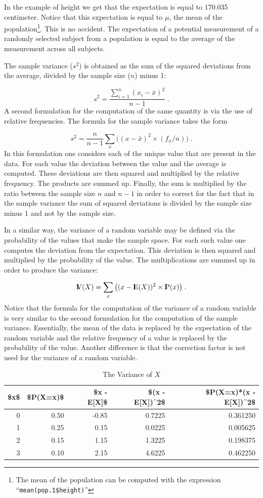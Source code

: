\documentclass[]{krantz}
\newcommand{\Expec}{{\rm I\kern-.3em E}}
\newcommand{\Prob}{{\rm I\kern-.3em P}}
\newcommand{\Var}{{\rm I\kern-.3em V}}
\theoremstyle{definition}
\theoremstyle{definition}
\theoremstyle{definition}
\theoremstyle{remark}
\begin{document}
In the example of height we get that the expectation is equal to 170.035
centimeter. Notice that this expectation is equal to \(\mu\), the mean
of the population\footnote{The mean of the population can be computed
  with the expression ``\texttt{mean(pop.1\$height)}''}. This is no
accident. The expectation of a potential measurement of a randomly
selected subject from a population is equal to the average of the
measurement across all subjects.

The sample variance (\(s^2\)) is obtained as the sum of the squared
deviations from the average, divided by the sample size (\(n\)) minus 1:

\[s^2 = \frac{\sum_{i=1}^n (x_i - \bar x)^2}{n-1}\;.\] A second
formulation for the computation of the same quantity is via the use of
relative frequencies. The formula for the sample variance takes the form

\[s^2 = \frac{n}{n-1}\sum_x \big((x - \bar x)^2\times (f_x/n)\big)\;.\]
In this formulation one considers each of the unique value that are
present in the data. For each value the deviation between the value and
the average is computed. These deviations are then squared and
multiplied by the relative frequency. The products are summed up.
Finally, the sum is multiplied by the ratio between the sample size
\(n\) and \(n-1\) in order to correct for the fact that in the sample
variance the sum of squared deviations is divided by the sample size
minus 1 and not by the sample size.

In a similar way, the variance of a random variable may be defined via
the probability of the values that make the sample space. For each such
value one computes the deviation from the expectation. This deviation is
then squared and multiplied by the probability of the value. The
multiplications are summed up in order to produce the variance:

\[\Var(X) = \sum_x\big( (x-\Expec(X))^2 \times \Prob(x)\big)\;.\] Notice
that the formula for the computation of the variance of a random
variable is very similar to the second formulation for the computation
of the sample variance. Essentially, the mean of the data is replaced by
the expectation of the random variable and the relative frequency of a
value is replaced by the probability of the value. Another difference is
that the correction factor is not used for the variance of a random
variable.

\begin{table}

\caption{\label{tab:tab3}The Variance of $X$}
\centering
\begin{tabular}[t]{rrrrr}
\toprule
\$x\$ & \$P(X=x)\$ & \$x - E[X]\$ & \$(x - E[X])\textasciicircum{}2\$ & \$P(X=x)*(x - E[X])\textasciicircum{}2\$\\
\midrule
0 & 0.50 & -0.85 & 0.7225 & 0.361250\\
1 & 0.25 & 0.15 & 0.0225 & 0.005625\\
2 & 0.15 & 1.15 & 1.3225 & 0.198375\\
3 & 0.10 & 2.15 & 4.6225 & 0.462250\\
\bottomrule
\end{tabular}
\end{table}
\end{document}
